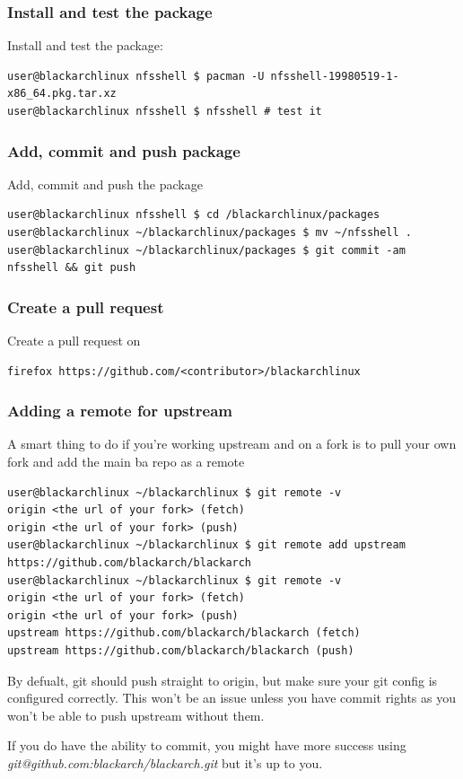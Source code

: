 \documentclass[a4paper, oneside, 11pt]{book}
\def\href#1#2{\htmladdnormallink{#2}{#1}}
\begin{document}
\subsubsection{Install and test the package}
Install and test the package:
{\small
\color{gray}
\begin{verbatim}
user@blackarchlinux nfsshell $ pacman -U nfsshell-19980519-1-x86_64.pkg.tar.xz
user@blackarchlinux nfsshell $ nfsshell # test it
\end{verbatim}
}

\subsubsection{Add, commit and push package}
Add, commit and push the package
{\small
\color{gray}
\begin{verbatim}
user@blackarchlinux nfsshell $ cd /blackarchlinux/packages
user@blackarchlinux ~/blackarchlinux/packages $ mv ~/nfsshell .
user@blackarchlinux ~/blackarchlinux/packages $ git commit -am nfsshell && git push
\end{verbatim}
}

\subsubsection{Create a pull request}
Create a pull request on \href{https://github.com/}{github.com}
{\small
\color{gray}
\begin{verbatim}
firefox https://github.com/<contributor>/blackarchlinux
\end{verbatim}
}

\subsubsection{Adding a remote for upstream}
A smart thing to do if you're working upstream and on a fork is to pull your own fork and add the main ba repo as a remote
{\small
\color{gray}
\begin{verbatim}
user@blackarchlinux ~/blackarchlinux $ git remote -v
origin <the url of your fork> (fetch)
origin <the url of your fork> (push)
user@blackarchlinux ~/blackarchlinux $ git remote add upstream https://github.com/blackarch/blackarch
user@blackarchlinux ~/blackarchlinux $ git remote -v
origin <the url of your fork> (fetch)
origin <the url of your fork> (push)
upstream https://github.com/blackarch/blackarch (fetch)
upstream https://github.com/blackarch/blackarch (push)
\end{verbatim}
By defualt, git should push straight to origin, but make sure your git config is
configured correctly. This won't be an issue unless you have commit rights as
you won't be able to push upstream without them.

If you do have the ability to commit, you might have more success using
\textit{git@github.com:blackarch/blackarch.git} but it's up to you.
}
\end{document}
